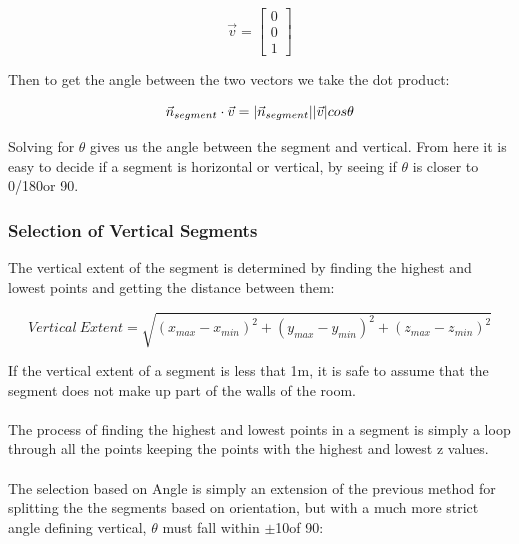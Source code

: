 			\begin{equation}
			\vec{v} = \begin{bmatrix}0\\0\\1\end{bmatrix}
			\end{equation}
			
			Then to get the angle between the two vectors we take the dot product:
			
			\begin{equation}
			\vec{n}_{segment}\cdot \vec{v} = \lvert \vec{n}_{segment} \rvert \lvert \vec{v} \rvert cos \theta
			\end{equation}
			
			Solving for $\theta$ gives us the angle between the segment and vertical. From here it is easy to decide if a segment is horizontal or vertical, by seeing if $\theta$ is closer to 0\textdegree/180\textdegree or 90\textdegree.
			
		\subsubsection{Selection of Vertical Segments}
			
			The vertical extent of the segment is determined by finding the highest and lowest points and getting the distance between them:
			
			\begin{equation}
			Vertical \: Extent = \sqrt{(x_{max} - x_{min})^2+(y_{max} - y_{min})^2+(z_{max} - z_{min})^2}
			\end{equation}
			
			If the vertical extent of a segment is less that 1m, it is safe to assume that the segment does not make up part of the walls of the room.\\
			\\
			The process of finding the highest and lowest points in a segment is simply a loop through all the points keeping the points with the highest and lowest z values.\\
			\\
			The selection based on Angle is simply an extension of the previous method for splitting the the segments based on orientation, but with a much more strict angle defining vertical, $\theta$ must fall within $\pm$10\textdegree of 90\textdegree:
			
